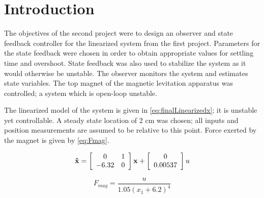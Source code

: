 \section{Introduction}

The objectives of the second project were to design an observer and state feedback controller for the linearized system from the first project.
Parameters for the state feedback were chosen in order to obtain appropriate values for settling time and overshoot.
State feedback was also used to stabilize the system as it would otherwise be unstable.
The observer monitors the system and estimates state variables.
The top magnet of the magnetic levitation apparatus was controlled; a system which is open-loop unstable.

The linearized model of the system is given in \ref{eq:finalLinearizedx}; it is unstable yet controllable.
A steady state location of 2 cm was chosen; all inputs and position measurements are assumed to be relative to this point.
Force exerted by the magnet is given by \ref{eq:Fmag}.

\begin{equation}
	\label{eq:finalLinearizedx}
	{\bf \dot{x}} = 
	\left[
		\begin{array}{cc}
			 0 & 1 \\
			-6.32 & 0 \\
		\end{array}
	\right]
		{\bf x}
	+ 
	\left[
		\begin{array}{c}
			 0 \\
			 0.00537 \\
		\end{array}
	\right]
		u
\end{equation}

\begin{equation}
	\label{eq:Fmag}
	F_{mag} = {\frac {u}{1.05 \left(x_1+6.2 \right) ^{4}}}
\end{equation}
